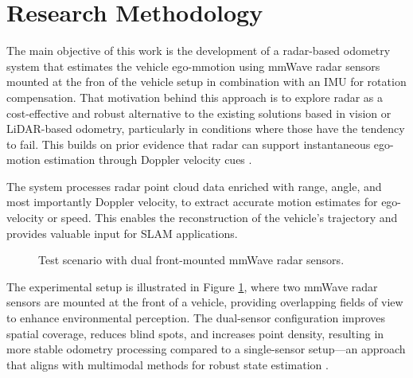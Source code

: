 \section{Research Methodology}
\label{sec:objective}
The main objective of this work is the development of a radar-based odometry system that estimates the vehicle ego-mmotion using mmWave radar sensors mounted at the fron of the vehicle setup in combination with an IMU for rotation compensation.
That motivation behind this approach is to explore radar as a cost-effective and robust alternative to the existing solutions based in vision or LiDAR-based odometry, particularly in conditions where those have the tendency to fail.
This builds on prior evidence that radar can support instantaneous ego-motion estimation through Doppler velocity cues \cite{EgoMotion_DopplerRadar}.

The system processes radar point cloud data enriched with range, angle, and most importantly Doppler velocity, to extract accurate motion estimates for ego-velocity or speed.
This enables the reconstruction of the vehicle’s trajectory and provides valuable input for SLAM applications.

\begin{figure}[!htbp]
    \centering
    \caption{Test scenario with dual front-mounted mmWave radar sensors.}
    \label{fig:test_scenario}
\end{figure}

The experimental setup is illustrated in Figure \ref{fig:test_scenario}, where two mmWave radar sensors are mounted at the front of a vehicle, providing overlapping fields of view to enhance environmental perception.
The dual-sensor configuration improves spatial coverage, reduces blind spots, and increases point density, resulting in more stable odometry processing compared to a single-sensor setup—an approach that aligns with multimodal methods for robust state estimation \cite{Multimodal_Offroad,HighSpeed_Estimation}.

